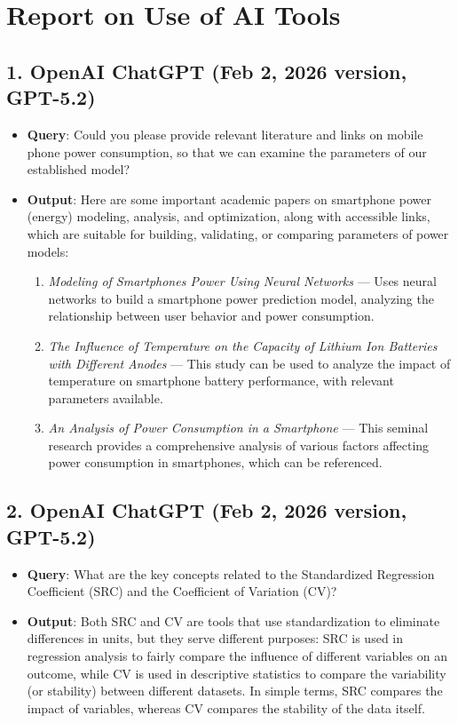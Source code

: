 \documentclass{mcmthesis}  %
\begin{document}
	
	\newpage
	\section*{\centering Report on Use of AI Tools}
	
	\subsection*{1. OpenAI ChatGPT (Feb 2, 2026 version, GPT-5.2)}
	\begin{itemize}
		\item \textbf{Query}: Could you please provide relevant literature and links on mobile phone power consumption, so that we can examine the parameters of our established model?
		\item \textbf{Output}: Here are some important academic papers on smartphone power (energy) modeling, analysis, and optimization, along with accessible links, which are suitable for building, validating, or comparing parameters of power models:
		\begin{enumerate}[label=(\arabic*)]
			\item \textit{Modeling of Smartphones Power Using Neural Networks} — Uses neural networks to build a smartphone power prediction model, analyzing the relationship between user behavior and power consumption.
			\item \textit{The Influence of Temperature on the Capacity of Lithium Ion Batteries with Different Anodes} — This study can be used to analyze the impact of temperature on smartphone battery performance, with relevant parameters available.
			\item \textit{An Analysis of Power Consumption in a Smartphone} — This seminal research provides a comprehensive analysis of various factors affecting power consumption in smartphones, which can be referenced.
		\end{enumerate}
	\end{itemize}
	
	\subsection*{2. OpenAI ChatGPT (Feb 2, 2026 version, GPT-5.2)}
	\begin{itemize}
		\item \textbf{Query}: What are the key concepts related to the Standardized Regression Coefficient (SRC) and the Coefficient of Variation (CV)?
		\item \textbf{Output}: Both SRC and CV are tools that use standardization to eliminate differences in units, but they serve different purposes: SRC is used in regression analysis to fairly compare the influence of different variables on an outcome, while CV is used in descriptive statistics to compare the variability (or stability) between different datasets. In simple terms, SRC compares the impact of variables, whereas CV compares the stability of the data itself.
	\end{itemize}
	
\end{document}
